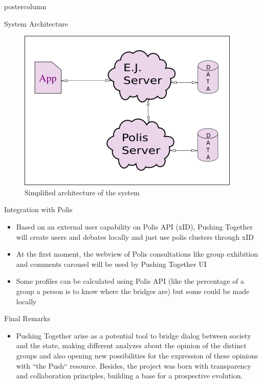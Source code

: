 \documentclass[final,hyperref={pdfpagelabels=false}]{beamer}
\begin{document}
\begin{frame}
\begin{columns}
\begin{column}{.49\textwidth}
\begin{beamercolorbox}[center,wd=\textwidth]{postercolumn}
\begin{minipage}[T]{.95\textwidth}
{\begin{block}{System Architecture}
  \begin{figure}
    \begin{center}
      \includegraphics[scale=1.5]{../images/architecture-1.png}
      \caption{Simplified architecture of the system}
      \label{fig:architecture}
    \end{center}
  \end{figure}
\end{block}

\begin{block}{Integration with Polis}
\begin{itemize}
  \item Based on an external user capability on Polis API (xID), Pushing Together
  will create users and debates locally and just use polis clusters through xID
  \item At the first moment, the webview of Polis consultations like group
  exhibition and comments carousel will be used by Pushing Together UI
  \item Some profiles can be calculated using Polis API (like the percentage of a
  group a person is to know where the bridges are) but some could be made locally

  \end{itemize}
\end{block}

\begin{block}{Final Remarks}
  \begin{itemize}
    \item Pushing Together arise as a potential tool to bridge dialog between society and
    the state, making different analyzes about the opinion of the distinct groups
    and also opening new possibilities for the expression of these opinions with ``the
    Push`` resource. Besides, the project was born with transparency and collaboration
    principles, building a base for a prospective evolution.


\end{itemize}
\end{block}}
\end{minipage}
\end{beamercolorbox}
\end{column}
\end{columns}
\end{frame}
\end{document}
